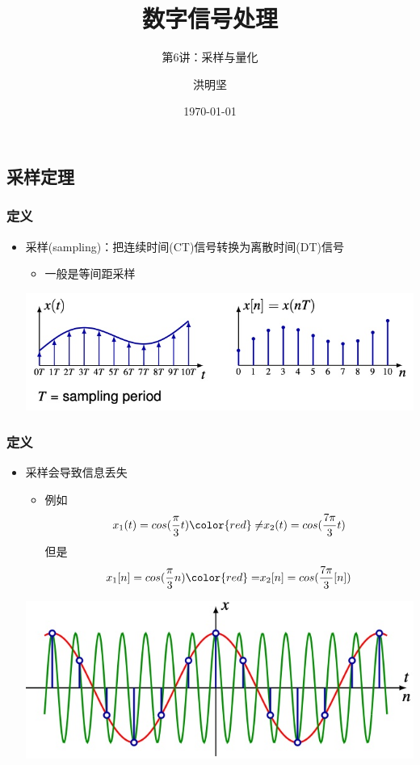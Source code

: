 \documentclass[CJKutf8,xcolor=pdftex,dvipsnames,table]{beamer}
\begin{document}
\begin{CJK*}{UTF8}{song}

  \title{数字信号处理}
  \subtitle{第6讲：采样与量化}
  \author{洪明坚}
  \date{\today}


  \frame{\titlepage}
  
  \section{采样定理}
  
  \begin{frame}
    \frametitle{定义}
    \begin{itemize}
	\item 采样(sampling)：把连续时间(CT)信号转换为离散时间(DT)信号
		\begin{itemize}
		\item 一般是等间距采样
		\end{itemize}
	\begin{center}
    \includegraphics[scale=.4]{sampling}	
	\end{center}
    \end{itemize}
  \end{frame}    
   
  \begin{frame}
    \frametitle{定义}
    \begin{itemize}
	\item 采样会导致信息丢失
		\begin{itemize}
		\item 例如
		\[
			x_1(t)=cos(\frac{\pi}{3}t) {\color{red} \neq} x_2(t)=cos(\frac{7\pi}{3}t) 
		\]
		但是
		\[
			x_1[n]=cos(\frac{\pi}{3}n) {\color{red} =} x_2[n]=cos(\frac{7\pi}{3}[n])
		\]
		\end{itemize}
	\begin{center}
    \includegraphics[scale=.4]{lossysampling}	
	\end{center}
	

\end{itemize}
\end{frame}
\end{CJK*}
\end{document}
